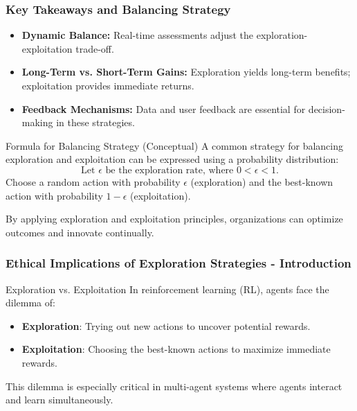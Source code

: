 \documentclass[aspectratio=169]{beamer}
\begin{document}
\begin{frame}[fragile]
  \frametitle{Key Takeaways and Balancing Strategy}
  \begin{itemize}
    \item \textbf{Dynamic Balance:} Real-time assessments adjust the exploration-exploitation trade-off.
    \item \textbf{Long-Term vs. Short-Term Gains:} Exploration yields long-term benefits; exploitation provides immediate returns.
    \item \textbf{Feedback Mechanisms:} Data and user feedback are essential for decision-making in these strategies.
  \end{itemize}
  
  \begin{block}{Formula for Balancing Strategy (Conceptual)}
    A common strategy for balancing exploration and exploitation can be expressed using a probability distribution:
    \begin{equation}
      \text{Let } \epsilon \text{ be the exploration rate, where } 0 < \epsilon < 1.
    \end{equation}
    Choose a random action with probability \( \epsilon \) (exploration) and the best-known action with probability \( 1 - \epsilon \) (exploitation).
  \end{block}
  
  By applying exploration and exploitation principles, organizations can optimize outcomes and innovate continually.
\end{frame}

\begin{frame}[fragile]
    \frametitle{Ethical Implications of Exploration Strategies - Introduction}
    \begin{block}{Exploration vs. Exploitation}
        In reinforcement learning (RL), agents face the dilemma of:
        \begin{itemize}
            \item \textbf{Exploration}: Trying out new actions to uncover potential rewards.
            \item \textbf{Exploitation}: Choosing the best-known actions to maximize immediate rewards.
        \end{itemize}
        This dilemma is especially critical in multi-agent systems where agents interact and learn simultaneously.
    \end{block}
\end{frame}
\end{document}
